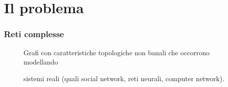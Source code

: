 \section{Il problema}

\begin{frame}
	\sectionpage
	\centering
\end{frame}

\begin{frame}
	\frametitle{Reti complesse}
	\centering
	\begin{figure}[h]
		\centering
		\begin{flushleft}
			Grafi con caratteristiche topologiche non banali che occorrono modellando 
			
			sistemi reali (quali social network, reti neurali, computer network).
		\end{flushleft}
		\medskip
		

\end{figure}
\end{frame}
